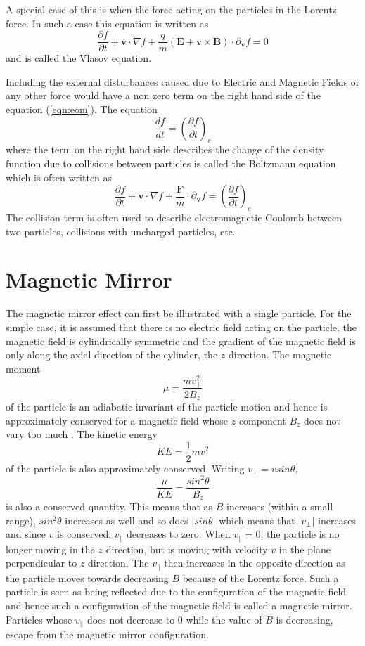 \documentclass[12pt]{article}
\begin{document}
{	\noindent A special case of this is when the force acting on the particles in the Lorentz force. In such a case this equation is written as
	\begin{equation}
		\label{eqn:vlasov}
		\frac{\partial f}{\partial t} + \textbf{v} \cdot \nabla f + \frac{q}{m} \left(\mathrm{\textbf{E}}+\textbf{v} \times \mathrm{\textbf{B}} \right) \cdot {\partial}_{\textbf{v}} f = 0
	\end{equation} and is called the Vlasov equation.
	
	\noindent Including the external disturbances caused due to Electric and Magnetic Fields or any other force would have a non zero term on the right hand side of the equation (\ref{eqn:eom}). The equation 
	\begin{equation}
		\label{eqn:boltzmann}
		\frac{df}{dt} = \left(\frac{\partial f}{\partial t}\right)_{c} 
	\end{equation} where the term on the right hand side describes the change of the density function due to collisions between particles is called the Boltzmann equation which is often written as $$\frac{\partial f}{\partial t} + \textbf{v} \cdot \nabla f + \frac{\textbf{F}}{m} \cdot {\partial}_{\textbf{v}} f = \left(\frac{\partial f}{\partial t}\right)_{c}$$The collision term is often used to describe electromagnetic Coulomb between two particles, collisions with uncharged particles, etc.
	

\section{Magnetic Mirror}
	The magnetic mirror effect can first be illustrated with a 	single particle. For the simple case, it is assumed that there is no electric field acting on the particle, the magnetic field is cylindrically symmetric and the gradient of the magnetic field is only along the axial direction of the cylinder, the $z$ direction.  The magnetic moment $$\mu = \frac{m v_{\perp}^{2}}{2B_{z}} $$ of the particle is an adiabatic invariant of the particle motion and hence is approximately conserved for a magnetic field whose $z$ component $B_{z}$ does not vary too much . The kinetic energy$$ KE = \frac{1}{2}m v^{2}$$ of the particle is also approximately conserved. Writing $v_{\perp} = v sin \theta$,
	$$\frac{\mu}{KE} = \frac{sin^{2}\theta}{B_{z}}$$ is also a conserved quantity. This means that as $B$ increases (within a small range), $sin^{2}\theta$ increases as well and so does $|sin\theta|$ which means that $|v_{\perp}|$ increases and since $v$ is conserved, $v_{\parallel}$ decreases to zero. When $v_{\parallel} = 0$, the particle is no longer moving in the $z$ direction, but is moving with velocity $v$ in the plane perpendicular to $z$ direction. The $v_{\parallel}$ then increases in the opposite direction as the particle moves towards decreasing $B$ because of the Lorentz force. Such a particle is seen as being reflected due to the configuration of the magnetic field and hence such a configuration of the magnetic field is called a magnetic mirror. Particles whose $v_{\parallel}$ does not decrease to 0 while the value of $B$ is decreasing, escape from the magnetic mirror configuration. \\
	
}
\end{document}

